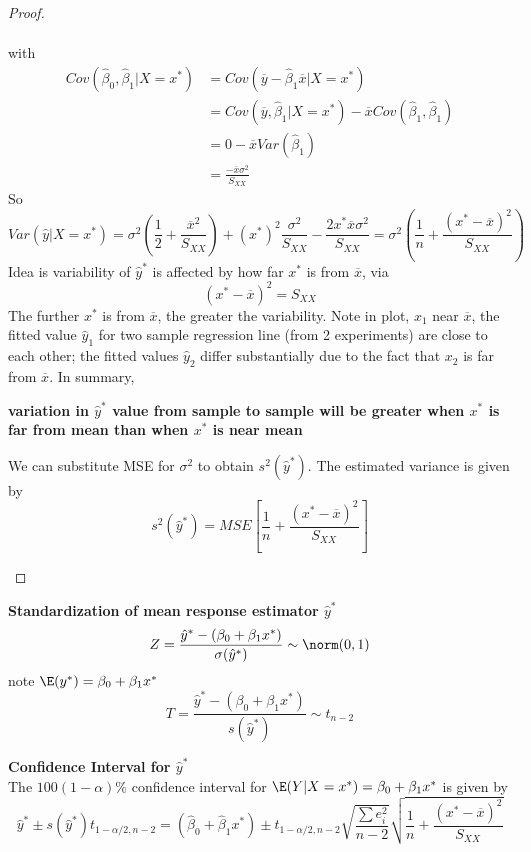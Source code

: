\documentclass[11pt]{article}
\begin{document}
\begin{defn*}
\begin{proof}
\begin{enumerate}
\begin{align*}
			\end{align*}
			with 
			\begin{align*}
				Cov(\hat{\beta}_0, \hat{\beta}_1 | X=x^*) 
				&= Cov(\overline{y} - \hat{\beta}_1 \overline{x} | X = x^*) \\
				&= Cov(\overline{y}, \hat{\beta}_1 | X = x^*) - \overline{x} Cov(\hat{\beta}_1, \hat{\beta}_1) \\
				&= 0 - \overline{x}Var(\hat{\beta}_1)\\
				&= \frac{-\overline{x}\sigma^2}{S_{XX}}
			\end{align*}
			So 
			\[
				Var(\hat{y} | X=x^*) = \sigma^2 \left( \frac{1}{2} + \frac{\overline{x}^2}{S_{XX}} \right) + (x^*)^2 \frac{\sigma^2}{S_{XX}} - \frac{2x^* \overline{x}\sigma^2}{S_{XX}} = \sigma^2 \left( \frac{1}{n} + \frac{(x^* - \overline{x})^2}{S_{XX}}\right)
			\]
			Idea is variability of $\hat{y}^*$ is affected by how far $x^*$ is from $\overline{x}$, via 
			\[
				(x^* - \overline{x})^2 = S_{XX}
			\]
			The further $x^*$ is from $\overline{x}$, the greater the variability. Note in plot, $x_1$ near $\overline{x}$, the fitted value $\hat{y}_1$ for two sample regression line (from 2 experiments) are close to each other; the fitted values $\hat{y}_2$ differ substantially due to the fact that $x_2$ is far from $\overline{x}$. In summary, 
			\begin{center}
				\textbf{variation in $\hat{y}^*$ value from sample to sample will be greater when $x^*$ is far from mean than when $x^*$ is near mean} 
			\end{center}
			We can substitute MSE for $\sigma^2$ to obtain $s^2(\hat{y}^*)$. The estimated variance is given by
			\[
				 s^2(\hat{y}^*) = MSE \left[ \frac{1}{n} + \frac{(x^* - \overline{x})^2}{S_{XX}} \right]
			\]
		\end{enumerate}
	\end{proof}
\end{defn*}

\begin{defn*}
	\textbf{Standardization of mean response estimator $\hat{y}^*$}\\
	\[
		Z = \frac{\hat{y}^* - (\beta_0 + \beta_1 x^*)}{\sigma(\hat{y}^*)} \sim \norm(0,1)
	\]
	note $\E(y^*) = \beta_0 + \beta_1 x^*$
	\[
		T = \frac{\hat{y}^* - (\beta_0 + \beta_1 x^*)}{s(\hat{y}^*)} \sim t_{n-2}
	\]
\end{defn*}

\begin{defn*}
	\textbf{Confidence Interval for $\hat{y}^*$}\\
	The $100(1-\alpha)\%$ confidence interval for $\E(Y|X=x^*)=\beta_0 + \beta_1 x^*$ is given by
	\[
		\hat{y}^* \pm s(\hat{y}^*) t_{1-\alpha/2, n-2} = (\hat{\beta}_0 + \hat{\beta}_1 x^*) \pm t_{1-\alpha/2, n-2} \sqrt{\frac{\sum e_i^2}{n-2}}\sqrt{ \frac{1}{n} + \frac{(x^* - \overline{x})^2}{S_{XX}} }
	\]
\end{defn*}
\end{document}
